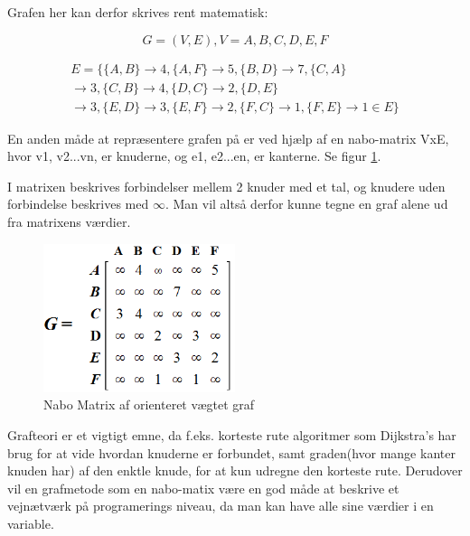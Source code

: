 \vspace{5mm}

Grafen her kan derfor skrives rent matematisk:

\begin{equation}
G = (V,E), V = {A,B,C,D,E,F}
\end{equation}

\begin{equation}\label{grafteori2}
\begin{split}
E = \{ \{A,B\} \rightarrow 4, \{A,F\} \rightarrow 5, \{B,D\} \rightarrow 7, \{C,A\} \\
\rightarrow 3, \{C,B\} \rightarrow 4, \{D,C\} \rightarrow 2, \{D,E\} \\
\rightarrow 3, \{E,D\} \rightarrow 3, \{E,F\} \rightarrow 2, \{F,C\} \rightarrow 1, \{F,E\} \rightarrow 1 \in  E\}
\end{split}
\end{equation}

\vspace{5mm}

En anden måde at repræsentere grafen på er ved hjælp af en nabo-matrix VxE, hvor v1, v2...vn, er knuderne, og e1, e2...en, er kanterne. Se figur \ref{fig:adjacency-matrix-weighted-directed-graph}. 

I matrixen beskrives forbindelser mellem 2 knuder med et tal, og knudere uden forbindelse beskrives med $\infty$. Man vil altså derfor kunne tegne en graf alene ud fra matrixens værdier.

\begin{figure}[H]
\begin{adjustbox}{width=0.5\textwidth,center=\textwidth}
\centering
\includegraphics[width=0.5\textwidth]{Pictures/Teoriafsnit/Figurfiler/adjacency_matrix_weighted_directed_graph.PNG}
\end{adjustbox}
\caption{Nabo Matrix af orienteret vægtet graf}
\label{fig:adjacency-matrix-weighted-directed-graph}
\end{figure}

Grafteori er et vigtigt emne, da f.eks. korteste rute algoritmer som Dijkstra's har brug for at vide hvordan knuderne er forbundet, samt graden(hvor mange kanter knuden har) af den enktle knude, for at kun udregne den korteste rute. Derudover vil en grafmetode som en nabo-matix være en god måde at beskrive et vejnætværk på programerings niveau, da man kan have alle sine værdier i en variable.


